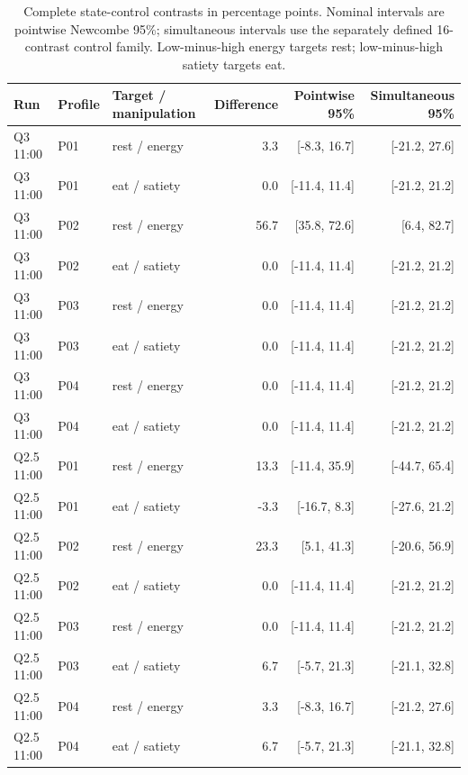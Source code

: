 \begin{table}[!ht]
\caption{Complete state-control contrasts in percentage points. Nominal intervals are pointwise Newcombe 95\%; simultaneous intervals use the separately defined 16-contrast control family. Low-minus-high energy targets rest; low-minus-high satiety targets eat.}
\label{tab:allcontrols}
\centering\small
\begin{tabular}{lllrrr}\toprule
Run & Profile & Target / manipulation & Difference & Pointwise 95\% & Simultaneous 95\%\\\midrule
Q3 11:00 & P01 & rest / energy & 3.3 & [-8.3, 16.7] & [-21.2, 27.6]\\
Q3 11:00 & P01 & eat / satiety & 0.0 & [-11.4, 11.4] & [-21.2, 21.2]\\
Q3 11:00 & P02 & rest / energy & 56.7 & [35.8, 72.6] & [6.4, 82.7]\\
Q3 11:00 & P02 & eat / satiety & 0.0 & [-11.4, 11.4] & [-21.2, 21.2]\\
Q3 11:00 & P03 & rest / energy & 0.0 & [-11.4, 11.4] & [-21.2, 21.2]\\
Q3 11:00 & P03 & eat / satiety & 0.0 & [-11.4, 11.4] & [-21.2, 21.2]\\
Q3 11:00 & P04 & rest / energy & 0.0 & [-11.4, 11.4] & [-21.2, 21.2]\\
Q3 11:00 & P04 & eat / satiety & 0.0 & [-11.4, 11.4] & [-21.2, 21.2]\\
Q2.5 11:00 & P01 & rest / energy & 13.3 & [-11.4, 35.9] & [-44.7, 65.4]\\
Q2.5 11:00 & P01 & eat / satiety & -3.3 & [-16.7, 8.3] & [-27.6, 21.2]\\
Q2.5 11:00 & P02 & rest / energy & 23.3 & [5.1, 41.3] & [-20.6, 56.9]\\
Q2.5 11:00 & P02 & eat / satiety & 0.0 & [-11.4, 11.4] & [-21.2, 21.2]\\
Q2.5 11:00 & P03 & rest / energy & 0.0 & [-11.4, 11.4] & [-21.2, 21.2]\\
Q2.5 11:00 & P03 & eat / satiety & 6.7 & [-5.7, 21.3] & [-21.1, 32.8]\\
Q2.5 11:00 & P04 & rest / energy & 3.3 & [-8.3, 16.7] & [-21.2, 27.6]\\
Q2.5 11:00 & P04 & eat / satiety & 6.7 & [-5.7, 21.3] & [-21.1, 32.8]\\
\bottomrule\end{tabular}
\end{table}
